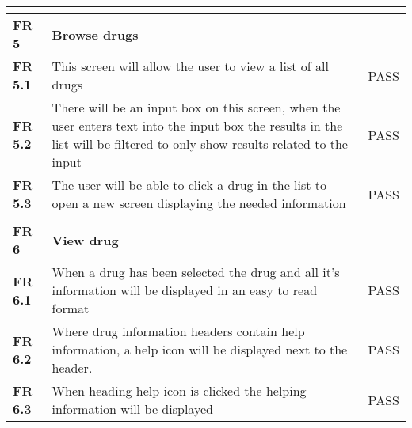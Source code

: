 \begin{center}
\begin{longtable}{| l | p{11cm} | c |}
\textbf{}                       &                                                                                                                                                                            &           \\ \hline
\textbf{FR 5}                   & \textbf{Browse drugs}                                                                                                                                                      &           \\ \hline
\textbf{FR 5.1}                 & This screen will allow the user to view a list of all drugs                                                                                                                & PASS      \\ \hline
\textbf{FR 5.2}                 & There will be an input box on this screen, when the user enters text into the input box the results in the list will be filtered to only show results related to the input & PASS      \\ \hline
\textbf{FR 5.3}                 & The user will be able to click a drug in the list to open a new screen displaying the needed information                                                                   & PASS      \\ \hline
\textbf{}                       &                                                                                                                                                                            &           \\ \hline
\textbf{FR 6}                   & \textbf{View drug}                                                                                                                                                         &           \\ \hline
\textbf{FR 6.1}                 & When a drug has been selected the drug and all it's information will be displayed in an easy to read format                                                                & PASS      \\ \hline
\textbf{FR 6.2}                 & Where drug information headers contain help information, a help icon will be displayed next to the header.                                                                 & PASS      \\ \hline
\textbf{FR 6.3}                 & When heading help icon is clicked the helping information will be displayed                                                                                                & PASS      \\ \hline

\end{longtable}
\end{center}
